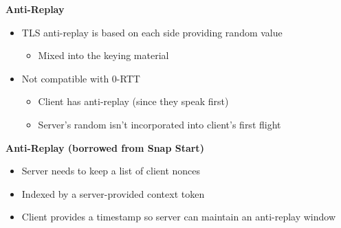 \documentclass[helvetica]{seminar}
\newcommand{\heading}[1]{%
  \begin{center} 
    \large\bf 
    #1 
  \end{center} 
  \vspace{.4 in}}
\begin{document}
\begin{slide}
\heading{Anti-Replay}

\begin{itemize}
\item TLS anti-replay is based on each side providing random value
  \begin{itemize}
  \item Mixed into the keying material
  \end{itemize}

\item Not compatible with 0-RTT
  \begin{itemize}
  \item Client has anti-replay (since they speak first)
  \item Server's random isn't incorporated into client's first flight
  \end{itemize}
\end{itemize}
\end{slide}



\begin{slide}
\heading{Anti-Replay (borrowed from Snap Start)}

\begin{itemize}
\item Server needs to keep a list of client nonces
\item Indexed by a server-provided context token
\item Client provides a timestamp so server can maintain an anti-replay window
\end{itemize}
\end{slide}
\end{document}
